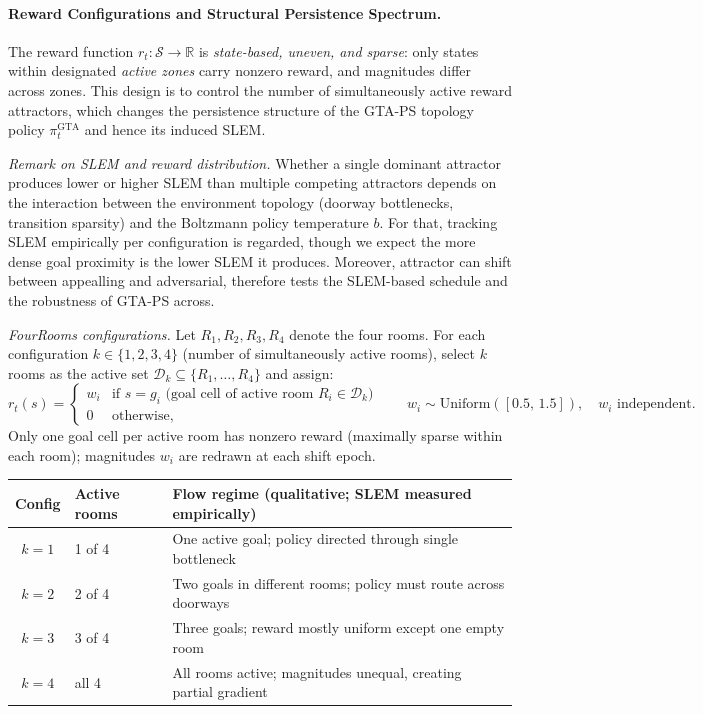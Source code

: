 \documentclass[10pt,a4paper]{article}
\begin{document}
\paragraph{Reward Configurations and Structural Persistence Spectrum.}
The reward function $r_t : \mathcal{S} \to \mathbb{R}$ is \emph{state-based, uneven, and sparse}:
only states within designated \emph{active zones} carry nonzero reward, and magnitudes differ
across zones. This design is to control the number of simultaneously active reward attractors,
which changes the persistence structure of the GTA-PS topology policy $\pi^{\mathrm{GTA}}_t$
and hence its induced SLEM.

\textit{Remark on SLEM and reward distribution.}
Whether a single dominant attractor produces lower or higher SLEM than multiple competing
attractors depends on the interaction between the environment topology (doorway bottlenecks,
transition sparsity) and the Boltzmann policy temperature $b$.
For that, tracking SLEM empirically per configuration is regarded, though we expect the more dense 
goal proximity is the lower SLEM it produces. Moreover, attractor can shift between appealling
and adversarial, therefore tests the SLEM-based schedule and the robustness of GTA-PS across.

\textit{FourRooms configurations.}
Let $R_1, R_2, R_3, R_4$ denote the four rooms.
For each configuration $k \in \{1,2,3,4\}$ (number of simultaneously active rooms),
select $k$ rooms as the active set $\mathcal{D}_k \subseteq \{R_1,\ldots,R_4\}$ and assign:
\[
  r_t(s) = \begin{cases} w_i & \text{if } s = g_i \text{ (goal cell of active room }
  R_i \in \mathcal{D}_k\text{)} \\ 0 & \text{otherwise,} \end{cases}
  \qquad w_i \sim \mathrm{Uniform}([0.5,\, 1.5]), \quad w_i \text{ independent.}
\]
Only one goal cell per active room has nonzero reward (maximally sparse within each room);
magnitudes $w_i$ are redrawn at each shift epoch.

\begin{center}\small
\renewcommand{\arraystretch}{1.1}
\begin{tabular}{clp{7.2cm}}
\toprule
Config & Active rooms & Flow regime (qualitative; SLEM measured empirically) \\
\midrule
$k{=}1$ & 1 of 4 & One active goal; policy directed through single bottleneck \\
$k{=}2$ & 2 of 4 & Two goals in different rooms; policy must route across doorways \\
$k{=}3$ & 3 of 4 & Three goals; reward mostly uniform except one empty room \\
$k{=}4$ & all 4 & All rooms active; magnitudes unequal, creating partial gradient \\
\bottomrule
\end{tabular}
\end{center}
\end{document}
